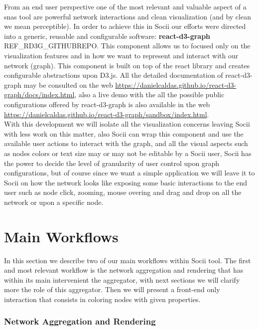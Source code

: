 From an end user perspective one of the most relevant and valuable aspect of a \glspl{sna} tool are powerful network interactions and clean visualization (and by clean we mean perceptible). In order to achieve this in Socii our efforts were directed into a generic, reusable and configurable software: \textbf{react-d3-graph} REF\_RD3G\_GITHUBREPO. This component allows us to focused only on the visualization features and in how we want to represent and interact with our network (graph). This component is built on top of the react library and creates configurable abstractions upon D3.js. All the detailed documentation of react-d3-graph
may be consulted on the web \cite{reactd3graph}\url{https://danielcaldas.github.io/react-d3-graph/docs/index.html}, also a live demo with the all the possible public configurations offered by react-d3-graph is also available in the web \url{https://danielcaldas.github.io/react-d3-graph/sandbox/index.html}.\\
With this development we will isolate all the visualization concerns leaving Socii with less work on this matter, also Socii can wrap this component and use the available user actions to interact with the graph, and all the visual aspects such as nodes colors or text size may or may not be editable by a Socii user, Socii has the power to decide the level of granularity of user control upon graph configurations, but of course since we want a simple application we will leave it to Socii on how the network looks like exposing some basic interactions to the end user such as node click, zooming, mouse overing and drag and drop on all the network or upon a specific node.

\section{Main Workflows}

In this section we describe two of our main workflows within Socii tool. The first and most relevant workflow is the network aggregation and rendering that has within its main intervenient the aggregator, with next sections we will clarify more the role of this aggregator. Then we will present a front-end only interaction that consists in coloring nodes with given properties.

\subsubsection{Network Aggregation and Rendering}

